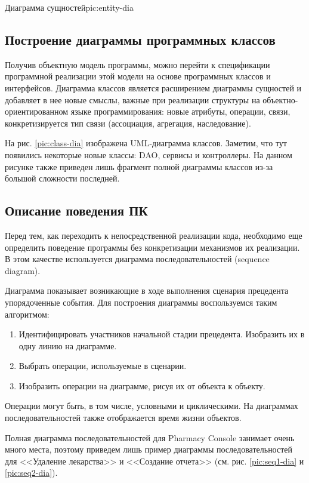 {Диаграмма сущностей}{pic:entity-dia}

\subsection{Построение диаграммы программных классов}


Получив объектную модель программы, можно перейти к спецификации программной
реализации этой модели на основе программных классов и интерфейсов. Диаграмма
классов является расширением диаграммы сущностей и добавляет в нее новые
смыслы, важные при реализации структуры на объектно-ориентированном языке
программирования: новые атрибуты, операции, связи, конкретизируется тип связи
(ассоциация, агрегация, наследование).

На рис. \ref{pic:class-dia} изображена UML-диаграмма классов. Заметим, что тут
появились некоторые новые классы: DAO, сервисы и контроллеры. На данном рисунке
также приведен лишь фрагмент полной диаграммы классов из-за большой сложности
последней.



\subsection{Описание поведения ПК}


Перед тем, как переходить к непосредственной реализации кода, необходимо еще
определить поведение программы без конкретизации механизмов их реализации. В
этом качестве используется диаграмма последовательностей (sequence diagram).

Диаграмма показывает возникающие в ходе выполнения сценария прецедента
упорядоченные события. Для построения диаграммы воспользуемся таким алгоритмом:
\begin{enumerate}
    \item Идентифицировать участников начальной стадии прецедента. Изобразить их
        в одну линию на диаграмме.
    \item Выбрать операции, используемые в сценарии.
    \item Изобразить операции на диаграмме, рисуя их от объекта к объекту.
\end{enumerate}

Операции могут быть, в том числе, условными и циклическими. На диаграммах
последовательностей также отображается время жизни объектов.

Полная диаграмма последовательностей для Pharmacy Console занимает очень много
места, поэтому приведем лишь пример диаграммы последовательностей для
<<Удаление лекарства>> и <<Создание отчета>> (см. рис. \ref{pic:seq1-dia} и
\ref{pic:seq2-dia}).

